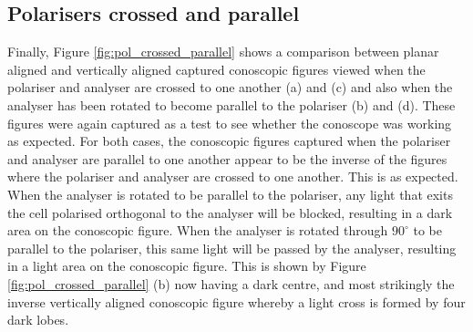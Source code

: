 \subsection{Polarisers crossed and parallel}
Finally, Figure \ref{fig:pol_crossed_parallel} shows a comparison between planar aligned and vertically aligned captured conoscopic figures viewed when the polariser and analyser are crossed to one another (a) and (c) and also when the analyser has been rotated to become parallel to the polariser (b) and (d). These figures were again captured as a test to see whether the conoscope was working as expected. For both cases, the conoscopic figures captured when the polariser and analyser are parallel to one another appear to be the inverse of the figures where the polariser and analyser are crossed to one another. This is as expected. When the analyser is rotated to be parallel to the polariser, any light that exits the cell polarised orthogonal to the analyser will be blocked, resulting in a dark area on the conoscopic figure. When the analyser is rotated through $90^{\circ}$ to be parallel to the polariser, this same light will be passed by the analyser, resulting in a light area on the conoscopic figure. This is shown by Figure \ref{fig:pol_crossed_parallel} (b) now having a dark centre, and most strikingly the inverse vertically aligned conoscopic figure whereby a light cross is formed by four dark lobes.

